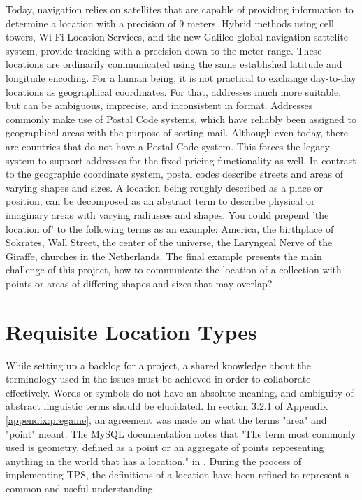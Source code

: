 Today, navigation relies on satellites that are capable of providing information to determine a location with a precision of 9 meters. Hybrid methods using cell towers, Wi-Fi Location Services, and the new Galileo global navigation sattelite system, provide tracking with a precision down to the meter range. These locations are ordinarily communicated using the same established latitude and longitude encoding. For a human being, it is not practical to exchange day-to-day locations as geographical coordinates. For that, addresses much more suitable, but can be ambiguous, imprecise, and inconsistent in format. Addresses commonly make use of Postal Code systems, which have reliably been assigned to geographical areas with the purpose of sorting mail. Although even today, there are countries that do not have a Postal Code system. This forces the legacy system to support addresses for the fixed pricing functionality as well. In contrast to the geographic coordinate system, postal codes describe streets and areas of varying shapes and sizes. A location being roughly described as a place or position, can be decomposed as an abstract term to describe physical or imaginary areas with varying radiusses and shapes. You could prepend 'the location of' to the following terms as an example: America, the birthplace of Sokrates, Wall Street, the center of the universe, the Laryngeal Nerve of the Giraffe, churches in the Netherlands. The final example presents the main challenge of this project, how to communicate the location of a collection with points or areas of differing shapes and sizes that may overlap?

%
\section{Requisite Location Types}
While setting up a backlog for a project, a shared knowledge about the terminology used in the issues must be achieved in order to collaborate effectively. Words or symbols do not have an absolute meaning, and ambiguity of abstract linguistic terms should be elucidated. In section 3.2.1 of Appendix \ref{appendix:pregame}, an agreement was made on what the terms "area" and "point" meant. The MySQL documentation notes that "The term most commonly used is geometry, defined as a point or an aggregate of points representing anything in the world that has a location." in \cite{MySQL-Spat}. During the process of implementing TPS, the definitions of a location have been refined to represent a common and useful understanding.

